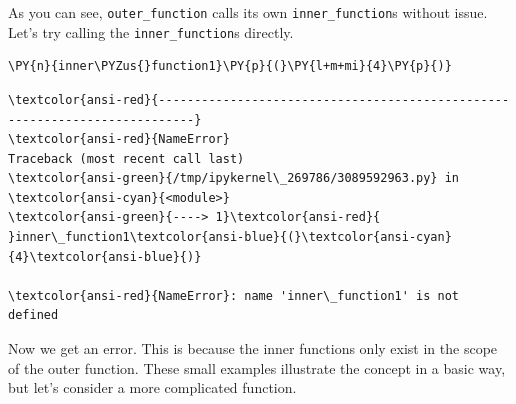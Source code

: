    As you can see, \texttt{outer\_function} calls its own
\texttt{inner\_function}s without issue. Let's try calling the
\texttt{inner\_function}s directly.

    \begin{tcolorbox}[breakable, size=fbox, boxrule=1pt, pad at break*=1mm,colback=cellbackground, colframe=cellborder]
\begin{Verbatim}[commandchars=\\\{\}]
\PY{n}{inner\PYZus{}function1}\PY{p}{(}\PY{l+m+mi}{4}\PY{p}{)}
\end{Verbatim}
\end{tcolorbox}

    \begin{Verbatim}[commandchars=\\\{\}, frame=single, framerule=2mm, rulecolor=\color{outerrorbackground}]
\textcolor{ansi-red}{---------------------------------------------------------------------------}
\textcolor{ansi-red}{NameError}                                 Traceback (most recent call last)
\textcolor{ansi-green}{/tmp/ipykernel\_269786/3089592963.py} in \textcolor{ansi-cyan}{<module>}
\textcolor{ansi-green}{----> 1}\textcolor{ansi-red}{ }inner\_function1\textcolor{ansi-blue}{(}\textcolor{ansi-cyan}{4}\textcolor{ansi-blue}{)}

\textcolor{ansi-red}{NameError}: name 'inner\_function1' is not defined
    \end{Verbatim}

    Now we get an error. This is because the inner functions only exist in
the scope of the outer function. These small examples illustrate the
concept in a basic way, but let's consider a more complicated function.

